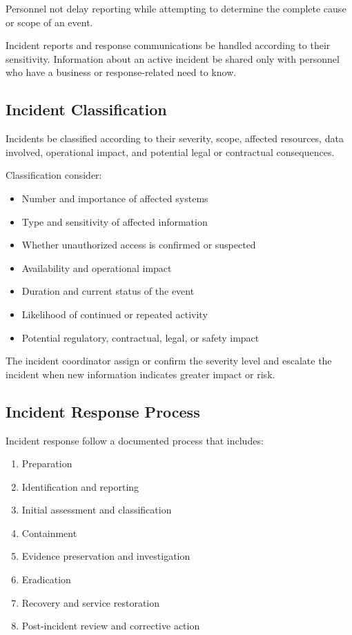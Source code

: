 Personnel \must{} not delay reporting while attempting to determine the complete cause or scope of an event.

Incident reports and response communications \must{} be handled according to their sensitivity. Information about an active incident \must{} be shared only with personnel who have a business or response-related need to know.

\subsection{Incident Classification}

Incidents \must{} be classified according to their severity, scope, affected resources, data involved, operational impact, and potential legal or contractual consequences.

Classification \should{} consider:
\begin{itemize}
    \item Number and importance of affected systems
    \item Type and sensitivity of affected information
    \item Whether unauthorized access is confirmed or suspected
    \item Availability and operational impact
    \item Duration and current status of the event
    \item Likelihood of continued or repeated activity
    \item Potential regulatory, contractual, legal, or safety impact
\end{itemize}

The incident coordinator \must{} assign or confirm the severity level and \must{} escalate the incident when new information indicates greater impact or risk.

\subsection{Incident Response Process}

Incident response \must{} follow a documented process that includes:
\begin{enumerate}
    \item Preparation
    \item Identification and reporting
    \item Initial assessment and classification
    \item Containment
    \item Evidence preservation and investigation
    \item Eradication
    \item Recovery and service restoration
    \item Post-incident review and corrective action
\end{enumerate}

